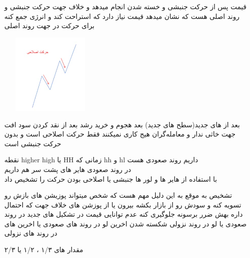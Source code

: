 \documentclass{article}
\begin{document}
		قیمت پس از حرکت جنبشی و خسته شدن انجام میدهد و خلاف جهت حرکت جنبشی و روند اصلی هست که نشان میدهد قیمت نیاز دارد که استراحت کند و انرژی جمع کنه برای حرکت در جهت روند اصلی

		\includegraphics[width=5cm, height=4cm]{pics/حرکت اصلاحی.png}


		بعد از های جدید(سطح های جدید) بعد هجوم و خرید رشد بعد 
		از نقد کردن سود افت\\
	 جهت خاثی ندار و معامله‌گران هیج کاری 			نمیکنند فقط  حرکت اصلاحی است و بدون حرکت جنبشی است\\
		
		
		نقطه higher high یا HH زمانی که hh و hl داریم روند صعودی هست\\
		در روند صعودی هایر های پشت سر هم داریم \\
		
		با استفاده از هایر ها و لور ها جنبشی یا اصلاحی بودن حرکت
		را تشخیص داد 
	
	
		تشخیص به موقع به این دلیل مهم هست که شخص میتواند پوزیشن های بازش رو
		تسویه کنه و سودش رو از بازار بکشه بیرون یا از پوزشن های
		خلاف جهت که احتمال داره بهش ضرر برسونه جلوگیری کنه
			 عدم توانایی قیمت در تشکیل های جدید در روند صعودی یا لو در روند نزولی
			 شکسته شدن اخرین لو در روند های صعودی یا اخرین 
			های در روند های نزولی 
		
				مقدار های ۱/۳ ، ۱/۲ یا ۲/۳
		
	
	
\end{document}

